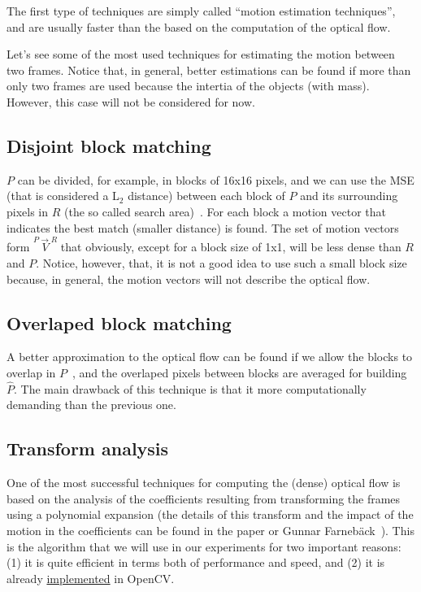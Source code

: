The first type of techniques are simply called ``motion estimation
techniques'', and are usually faster than the based on the computation
of the optical flow.


Let's see some of the most used techniques for estimating the motion
between two frames. Notice that, in general, better estimations can be
found if more than only two frames are used because the intertia of
the objects (with mass). However, this case will not be considered for
now.

\subsection{Disjoint block matching}
$P$ can be divided, for example, in blocks of 16x16 pixels, and we can
use the MSE (that is considered a L$_2$ distance) between each block
of $P$ and its surrounding pixels in $R$ (the so called search
area)~\cite{zhu2000new}. For each block a motion vector that indicates
the best match (smaller distance) is found. The set of motion vectors
form $\overset{P\rightarrow R}{V}$ that obviously, except for a block
size of 1x1, will be less dense than $R$ and $P$. Notice, however,
that, it is not a good idea to use such a small block size because, in
general, the motion vectors will not describe the optical flow.

\subsection{Overlaped block matching}
A better approximation to the optical flow can be found if we allow
the blocks to overlap in $P$~\cite{orchard1994overlapped}, and the
overlaped pixels between blocks are averaged for building
$\hat{P}$. The main drawback of this technique is that it more
computationally demanding than the previous one.

\subsection{Transform analysis}
One of the most successful techniques for computing the (dense)
optical flow is based on the analysis of the coefficients resulting
from transforming the frames using a polynomial expansion (the details
of this transform and the impact of the motion in the coefficients can
be found in the paper or Gunnar
Farneb{\"a}ck~\cite{farneback2003two}). This is the algorithm that we
will use in our experiments for two important reasons: (1) it is quite
efficient in terms both of performance and speed, and (2) it is
already
\href{https://docs.opencv.org/3.4/d4/dee/tutorial_optical_flow.html}{implemented}
in OpenCV.


